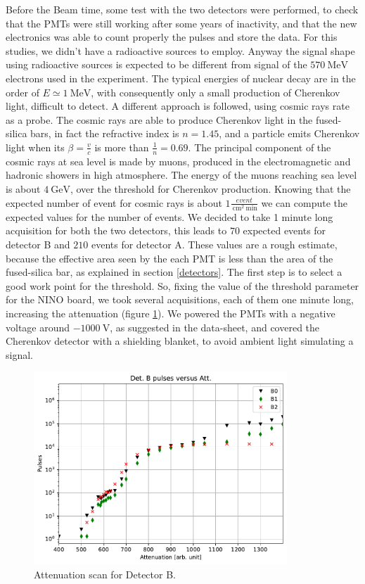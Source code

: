 Before the Beam time, some test with the two detectors were performed, to check that the PMTs were still working after some years of inactivity, and that the new electronics was able to count properly the pulses and store the data. For this studies, we didn't have a radioactive sources to employ. Anyway the signal shape using radioactive sources is expected to be different from signal of the $\SI{570}{\mega \electronvolt}$ electrons used in the experiment. The typical energies of nuclear decay are in the order of $E \simeq \SI{1}{\mega \electronvolt}$,  with consequently only a small production of Cherenkov light, difficult to detect. A different approach is followed, using cosmic rays rate as a probe. 
The cosmic rays are able to produce Cherenkov light in the fused-silica bars, in fact the refractive index is $n = 1.45$, and a particle emits Cherenkov light when its $\beta = \frac{v}{c}$ is more than $\frac{1}{n} = 0.69$. The principal component of the cosmic rays at sea level is made by muons, produced in the electromagnetic and hadronic showers in high atmosphere. The energy of the muons reaching sea level is about $\SI{4}{\giga \electronvolt}$, over the threshold for Cherenkov production.
Knowing that the expected number of event for cosmic rays is about $1 \frac{event}{\SI{}{\centi \meter\squared} \SI{}{\minute}}$ we can compute the expected values for the number of events. We decided to take 1 minute long acquisition for both the two detectors, this leads to $70$ expected events for detector B  and  $210$ events for detector A. These values are a rough estimate, because the effective area seen by the each PMT is less than the area of the fused-silica bar, as explained in section \ref{detectors}.  
The first step is to select a good work point for the threshold. So, fixing the value of the threshold parameter for the NINO board, we took several acquisitions, each of them one minute long, increasing the attenuation (figure \ref{fig:AttB}). We powered the PMTs with a negative voltage around $\SI{-1000}{\volt}$, as suggested in the data-sheet, and covered the Cherenkov detector with a shielding blanket, to avoid ambient light simulating a signal.

\begin{figure}[!ht]
\centering
\includegraphics[width = 0.85\textwidth]{Analysis/AttenuationB.pdf}
\caption{Attenuation scan for Detector B.}
\label{fig:AttB}
\end{figure}

